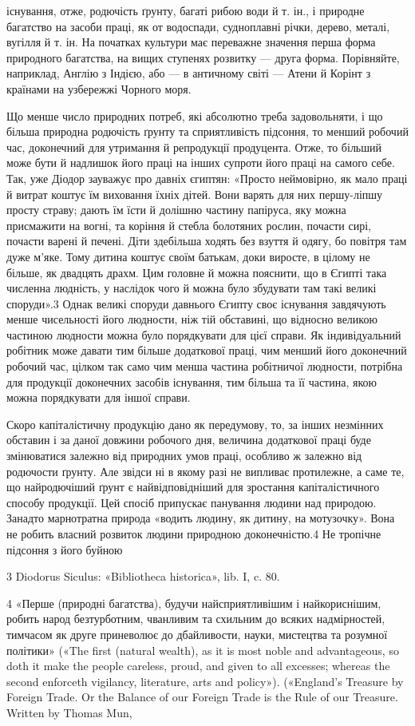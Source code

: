 існування, отже, родючість ґрунту, багаті рибою води й т. ін.,
і природне багатство на засоби праці, як от водоспади, судноплавні
річки, дерево, металі, вугілля й т. ін. На початках культури
має переважне значення перша форма природного багатства,
на вищих ступенях розвитку — друга форма. Порівняйте,
наприклад, Англію з Індією, або — в античному світі — Атени
й Корінт з країнами на узбережжі Чорного моря.

Що менше число природних потреб, які абсолютно треба
задовольняти, і що більша природна родючість ґрунту та сприятливість
підсоння, то менший робочий час, доконечний для утримання
й репродукції продуцента. Отже, то більший може бути й
надлишок його праці на інших супроти його праці на самого себе.
Так, уже Діодор зауважує про давніх єгиптян: «Просто неймовірно,
як мало праці й витрат коштує їм виховання їхніх дітей.
Вони варять для них першу-ліпшу просту страву; дають їм
їсти й долішню частину папіруса, яку можна присмажити на
вогні, та коріння й стебла болотяних рослин, почасти сирі, почасти
варені й печені. Діти здебільша ходять без взуття й одягу,
бо повітря там дуже м’яке. Тому дитина коштує своїм батькам,
доки виросте, в цілому не більше, як двадцять драхм. Цим головне
й можна пояснити, що в Єгипті така численна людність,
у наслідок чого й можна було збудувати там такі великі споруди».3
Однак великі споруди давнього Єгипту своє існування
завдячують менше чисельності його людности, ніж тій обставині,
що відносно великою частиною людности можна було порядкувати
для цієї справи. Як індивідуальний робітник може давати
тим більше додаткової праці, чим менший його доконечний робочий
час, цілком так само чим менша частина робітничої людности,
потрібна для продукції доконечних засобів існування,
тим більша та її частина, якою можна порядкувати для іншої
справи.

Скоро капіталістичну продукцію дано як передумову, то, за
інших незмінних обставин і за даної довжини робочого дня, величина
додаткової праці буде змінюватися залежно від природних
умов праці, особливо ж залежно від родючости ґрунту. Але звідси
ні в якому разі не випливає протилежне, а саме те, що найродючіший
ґрунт є найвідповідніший для зростання капіталістичного
способу продукції. Цей спосіб припускає панування людини над
природою. Занадто марнотратна природа «водить людину, як
дитину, на мотузочку». Вона не робить власний розвиток людини
природною доконечністю.4 Не тропічне підсоння з його буйною

3 Diodorus Siculus: «Bibliotheca historica», lib. I, c. 80.

4 «Перше (природні багатства), будучи найсприятливішим і найкориснішим,
робить народ безтурботним, чванливим та схильним до всяких
надмірностей, тимчасом як друге приневолює до дбайливости, науки,
мистецтва та розумної політики» («The first (natural wealth), as it
is most noble and advantageous, so doth it make the people careless, proud,
and given to all excesses; whereas the second enforceth vigilancy, literature,
arts and policy»). («England’s Treasure by Foreign Trade. Or the Balance
of our Foreign Trade is the Rule of our Treasure. Written by Thomas Mun,
